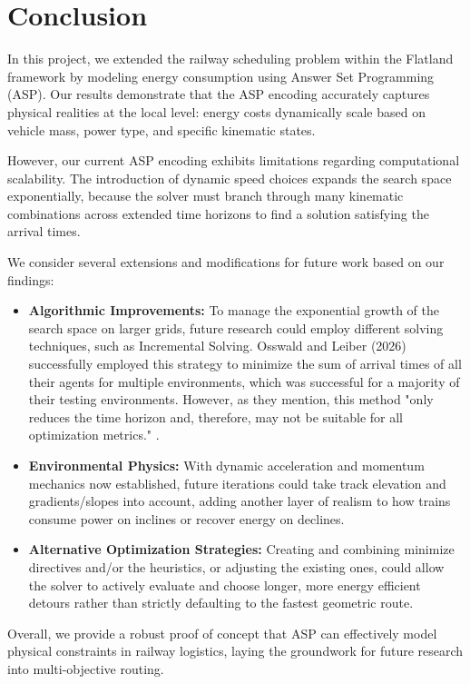 \raggedbottom
\section{Conclusion}
In this project, we extended the railway scheduling problem within the Flatland framework by modeling energy consumption using Answer Set Programming (ASP). Our results demonstrate that the ASP encoding accurately captures physical realities at the local level: energy costs dynamically scale based on vehicle mass, power type, and specific kinematic states.

However, our current ASP encoding exhibits limitations regarding computational scalability. The introduction of dynamic speed choices expands the search space exponentially, because the solver must branch through many kinematic combinations across extended time horizons to find a solution satisfying the arrival times.

We consider several extensions and modifications for future work based on our findings:
\begin{itemize}
    \item \textbf{Algorithmic Improvements:} To manage the exponential growth of the search space on larger grids, future research could employ different solving techniques, such as Incremental Solving. Osswald and Leiber (2026) successfully employed this strategy to minimize the sum of arrival times of all their agents for multiple environments, which was successful for a majority of their testing environments. However, as they mention, this method "only reduces the time horizon and, therefore, may not be suitable for all optimization metrics." \cite{osswald_railway_2026}.
    \item \textbf{Environmental Physics:} With dynamic acceleration and momentum mechanics now established, future iterations could take track elevation and gradients/slopes into account, adding another layer of realism to how trains consume power on inclines or recover energy on declines.
    \item \textbf{Alternative Optimization Strategies:} Creating and combining minimize directives and/or the heuristics, or adjusting the existing ones, could allow the solver to actively evaluate and choose longer, more energy efficient detours rather than strictly defaulting to the fastest geometric route.
\end{itemize}

Overall, we provide a robust proof of concept that ASP can effectively model physical constraints in railway logistics, laying the groundwork for future research into multi-objective routing.
